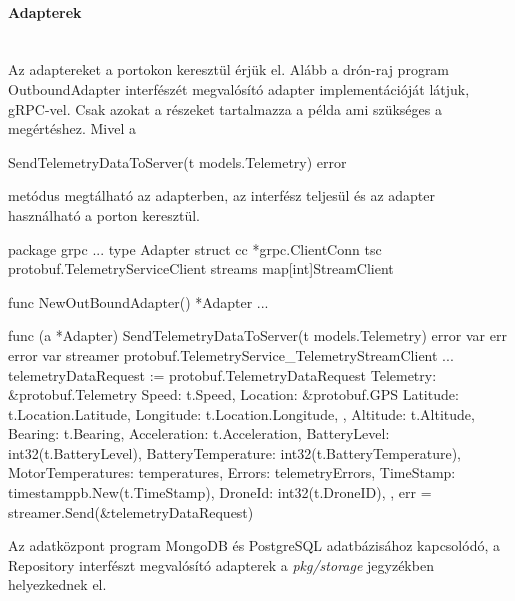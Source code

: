 \paragraph{Adapterek} \mbox{} \\
Az adaptereket a portokon keresztül érjük el.
Alább a drón-raj program OutboundAdapter interfészét megvalósító adapter implementációját látjuk, gRPC-vel.
Csak azokat a részeket tartalmazza a példa ami szükséges a megértéshez.
Mivel a
\begin{python}
    SendTelemetryDataToServer(t models.Telemetry) error
\end{python}
metódus megtálható az adapterben, az interfész teljesül és az adapter használható a porton keresztül.
\begin{python}
    package grpc
    ...
    type Adapter struct {
        cc  *grpc.ClientConn
        tsc protobuf.TelemetryServiceClient
        streams map[int]StreamClient
    }

    func NewOutBoundAdapter() *Adapter {
        ...
    }

    func (a *Adapter) SendTelemetryDataToServer(t models.Telemetry) error {
        var err error
        var streamer protobuf.TelemetryService_TelemetryStreamClient
        ...
        telemetryDataRequest := protobuf.TelemetryDataRequest{
            Telemetry: &protobuf.Telemetry{
                Speed: t.Speed,
                Location: &protobuf.GPS{
                    Latitude:  t.Location.Latitude,
                    Longitude: t.Location.Longitude,
                },
                Altitude:           t.Altitude,
                Bearing:            t.Bearing,
                Acceleration:       t.Acceleration,
                BatteryLevel:       int32(t.BatteryLevel),
                BatteryTemperature: int32(t.BatteryTemperature),
                MotorTemperatures:  temperatures,
                Errors:             telemetryErrors,
                TimeStamp:          timestamppb.New(t.TimeStamp),
                DroneId:            int32(t.DroneID),
            },
        }
        err = streamer.Send(&telemetryDataRequest)
    }

\end{python}

Az adatközpont program MongoDB és PostgreSQL adatbázisához kapcsolódó, a Repository interfészt megvalósító adapterek a \textit{pkg/storage} jegyzékben helyezkednek el.


